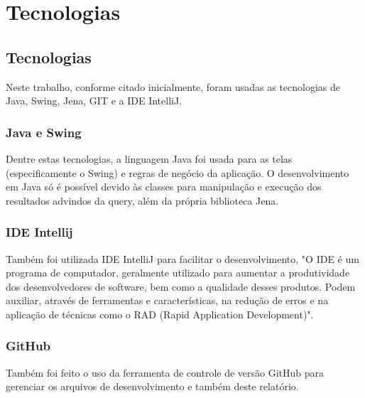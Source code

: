 \chapter{Tecnologias}\label{cap_tecnologias}

\section{Tecnologias}
Neste trabalho, conforme citado inicialmente, foram usadas as tecnologias de Java, Swing, Jena, GIT e a IDE IntelliJ.

\subsection{Java e Swing}
Dentre estas tecnologias, a linguagem Java foi usada para as telas (especificamente o Swing) e regras de negócio da aplicação. O desenvolvimento em Java só é possível devido às classes para manipulação e execução dos resultados advindos da query, além da própria biblioteca Jena.

\subsection{IDE Intellij}
Também foi utilizada IDE IntelliJ para facilitar o desenvolvimento, "O IDE é um programa de computador, geralmente utilizado para aumentar a produtividade dos desenvolvedores de software, bem como a qualidade desses produtos. Podem auxiliar, através de ferramentas e características, na redução de erros e na aplicação de técnicas como o RAD (Rapid Application Development)".

\subsection{GitHub}
Também foi feito o uso da ferramenta de controle de versão GitHub para gerenciar os arquivos de desenvolvimento e também deste relatório.